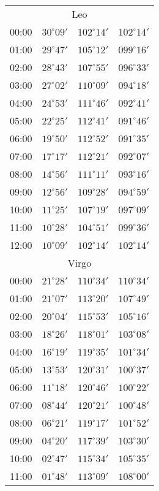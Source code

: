 \begin{table}
\begin{Parallel}{}{}
{{\begin{tabular}{l|lll}
\multicolumn{4}{c}{Leo}\\
00:00 & $30^\circ 09'$ & $102^\circ 14'$& $102^\circ 14'$ \\
01:00 & $29^\circ 47'$ & $105^\circ 12'$& $099^\circ 16'$ \\
02:00 & $28^\circ 43'$ & $107^\circ 55'$& $096^\circ 33'$ \\
03:00 & $27^\circ 02'$ & $110^\circ 09'$& $094^\circ 18'$ \\
04:00 & $24^\circ 53'$ & $111^\circ 46'$& $092^\circ 41'$ \\
05:00 & $22^\circ 25'$ & $112^\circ 41'$& $091^\circ 46'$ \\
06:00 & $19^\circ 50'$ & $112^\circ 52'$& $091^\circ 35'$ \\
07:00 & $17^\circ 17'$ & $112^\circ 21'$& $092^\circ 07'$ \\
08:00 & $14^\circ 56'$ & $111^\circ 11'$& $093^\circ 16'$ \\
09:00 & $12^\circ 56'$ & $109^\circ 28'$& $094^\circ 59'$ \\
10:00 & $11^\circ 25'$ & $107^\circ 19'$& $097^\circ 09'$ \\
11:00 & $10^\circ 28'$ & $104^\circ 51'$& $099^\circ 36'$ \\
12:00 & $10^\circ 09'$ & $102^\circ 14'$& $102^\circ 14'$ \\
\multicolumn{4}{c}{Virgo}\\
00:00 & $21^\circ 28'$ & $110^\circ 34'$& $110^\circ 34'$ \\
01:00 & $21^\circ 07'$ & $113^\circ 20'$& $107^\circ 49'$ \\
02:00 & $20^\circ 04'$ & $115^\circ 53'$& $105^\circ 16'$ \\
03:00 & $18^\circ 26'$ & $118^\circ 01'$& $103^\circ 08'$ \\
04:00 & $16^\circ 19'$ & $119^\circ 35'$& $101^\circ 34'$ \\
05:00 & $13^\circ 53'$ & $120^\circ 31'$& $100^\circ 37'$ \\
06:00 & $11^\circ 18'$ & $120^\circ 46'$& $100^\circ 22'$ \\
07:00 & $08^\circ 44'$ & $120^\circ 21'$& $100^\circ 48'$ \\
08:00 & $06^\circ 21'$ & $119^\circ 17'$& $101^\circ 52'$ \\
09:00 & $04^\circ 20'$ & $117^\circ 39'$& $103^\circ 30'$ \\
10:00 & $02^\circ 47'$ & $115^\circ 34'$& $105^\circ 35'$ \\
11:00 & $01^\circ 48'$ & $113^\circ 09'$& $108^\circ 00'$ \\

\end{tabular}}}
\end{Parallel}
\end{table}
